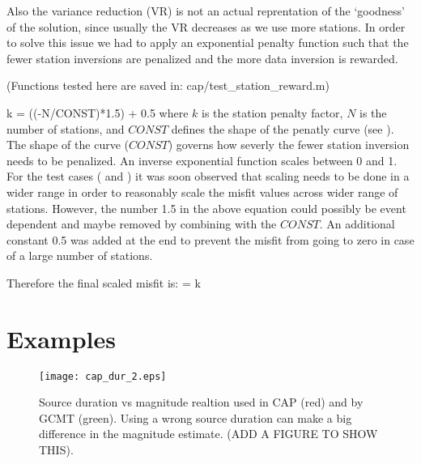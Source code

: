 \documentclass[11pt,titlepage,fleqn]{article}
\begin{document}
Also the variance reduction (VR) is not an actual reprentation of the `goodness' of the solution, since usually the VR decreases as we use more stations. In order to solve this issue we had to apply an exponential penalty function such that the fewer station inversions are penalized and the more data inversion is rewarded. 

(Functions tested here are saved in: cap/test\_station\_reward.m)

\eq
k = (\exp (-N/CONST)*1.5) + 0.5
\en 
where $k$ is the station penalty factor, $N$ is the number of stations, and $CONST$ defines the shape of the penatly curve (see ). The shape of the curve ($CONST$) governs how severly the fewer station inversion needs to be penalized. An inverse exponential function scales between 0 and 1. For the test cases ( and ) it was soon observed that scaling needs to be done in a wider range in order to reasonably scale the misfit values across wider range of stations. However, the number 1.5 in the above equation could possibly be event dependent and maybe removed by combining with the $CONST$. An additional constant 0.5 was added at the end to prevent the misfit from going to zero in case of a large number of stations. 

Therefore the final scaled misfit is:
\eq
\Phi = k \times \Phi
\en



\section{Examples}
\cite{SilwalTape2016,AlvizuriTape2016,Silwal2015catalog_SAK,Silwal2015catalog_MFFZ,Alvizuri2015catalog,Alvizuri2017}
\pagebreak



\begin{figure}
\texttt{[image: cap\_dur\_2.eps]}
\caption{Source duration vs magnitude realtion used in CAP (red) and by GCMT (green). Using a wrong source duration can make a big difference in the magnitude estimate. (ADD A FIGURE TO SHOW THIS).
\label{fig:cap_dur}
}
\end{figure}
\end{document}
